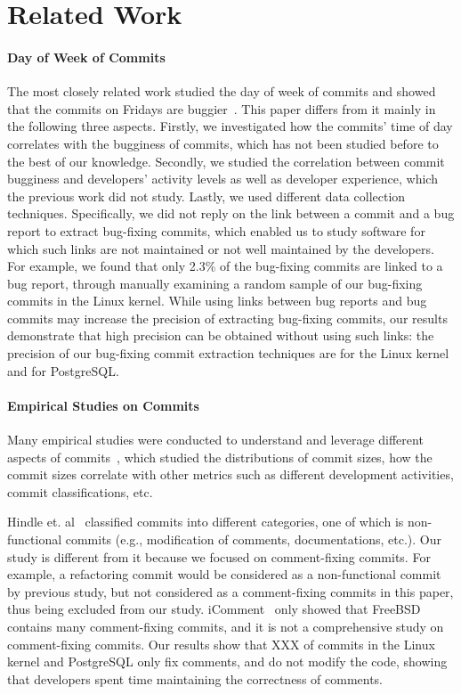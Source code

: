 \section{Related Work}
\label{sec-related}

\paragraph{Day of Week of Commits}
The most closely related work studied the day of week of commits and
showed that the commits on Fridays are buggier~\cite{sliwerski-msr-2005}. 
This paper differs from it mainly in the following three aspects.
Firstly, we investigated how the commits' time of day correlates with the bugginess of commits, 
which has not been studied before to the best of our knowledge.
Secondly, we studied the correlation between commit bugginess and developers' activity levels as well as 
developer experience, which the previous work did not study.
Lastly, we used different data collection techniques. Specifically, we did not reply on the link 
between a commit and a bug report to extract bug-fixing commits, which enabled us to study 
software for which such links are not maintained or not well maintained by the developers. For example, we 
found that only 2.3\% of the bug-fixing commits are linked to a bug report, 
through manually examining a random sample of our bug-fixing commits in the Linux kernel.
While using links between bug reports and bug commits may increase the precision of extracting 
bug-fixing commits, our results demonstrate that 
high precision can be obtained without using such links: 
the precision of our bug-fixing commit extraction techniques are 
\linuxP for the Linux kernel and \postP for PostgreSQL.

\paragraph{Empirical Studies on Commits}
Many empirical studies were conducted to understand and leverage different aspects of 
commits~\cite{hattori2008nature,largeCommits,commitTextualClassification, smallCommits05, Swanson76}, which 
studied the distributions of commit sizes, how the commit sizes correlate with other metrics 
such as different development activities, commit classifications, etc. 

Hindle et. al~\cite{largeCommits} classified commits into different categories, one of which 
is non-functional commits (e.g., modification of comments, documentations, etc.).
Our study is different from it because we focused on
comment-fixing commits. For example, a refactoring commit 
would be considered as a non-functional commit by previous study, but not considered as a comment-fixing commits in this paper, 
thus being excluded from our study. 
iComment~\cite{iComment} only showed that FreeBSD contains many comment-fixing commits, and it is 
not a comprehensive study on comment-fixing commits.  
Our results show that XXX of commits in the Linux kernel and PostgreSQL only fix comments, and do not modify the code, showing
that developers spent time maintaining the correctness of comments. 


